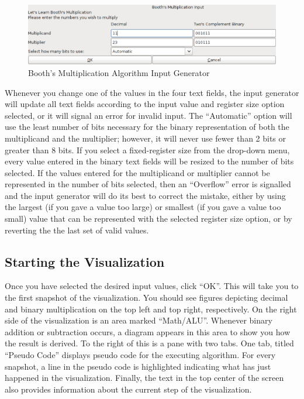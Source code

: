 \documentclass{article}
\begin{document}
\begin{figure}[h]
\centering
\includegraphics[scale=0.3]{ingen.pdf}
\caption{Booth's Multiplication Algorithm Input Generator}
\end{figure}

Whenever you change one of the values in the four text fields, the input generator will update all text fields according to the input value and register size option selected, or it will signal an error for invalid input.
The ``Automatic'' option will use the least number of bits necessary for the binary representation of both the multiplicand and the multiplier; however, it will never use fewer than 2 bits or greater than 8 bits.
If you select a fixed-register size from the drop-down menu, every value entered in the binary text fields will be resized to the number of bits selected.
If the values entered for the multiplicand or multiplier cannot be represented in the number of bits selected, then an ``Overflow'' error is signalled and the input generator will do its best to correct the mistake, either by using the largest (if you gave a value too large) or smallest (if you gave a value too small) value that can be represented with the selected register size option, or by reverting the the last set of valid values.

\pagebreak
\subsection{Starting the Visualization}

Once you have selected the desired input values, click ``OK''.
This will take you to the first snapshot of the visualization.
You should see figures depicting decimal and binary multiplication on the top left and top right, respectively.
On the right side of the visualization is an area marked ``Math/ALU''.
Whenever binary addition or subtraction occurs, a diagram appears in this area to show you how the result is derived.
To the right of this is a pane with two tabs.
One tab, titled ``Pseudo Code'' displays pseudo code for the executing algorithm.
For every snapshot, a line in the pseudo code is highlighted indicating what has just happened in the visualization.
Finally, the text in the top center of the screen also provides information about the current step of the visualization.
\end{document}
